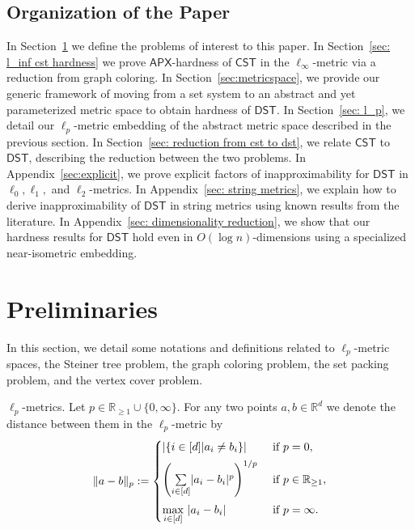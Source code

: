 \documentclass{article}\providecommand{\DeclareRedundantLanguages}[2]{}\usepackage[a4paper,margin=20mm]{geometry}
\newcommand{\R}{\mathbb{R}}
\newcommand{\1}{\textbf{1}}
\newcommand{\cst}{$\mathsf{CST}$\xspace}
\newcommand{\dst}{$\mathsf{DST}$\xspace}
\newcommand{\apx}{$\mathsf{APX}$\xspace}
\newcommand{\reals}{\mathbb{R}_{\ge 1}\cup\{0,\infty\}}
\begin{document}
\subsection{Organization of the Paper}
In Section~\ref{sec:prelim} we define the problems of interest to this paper. 
In Section~\ref{sec: l_inf cst hardness} we prove \apx-hardness of \cst in the $\ell_{\infty}$-metric via a reduction from graph coloring. In Section~\ref{sec:metricspace}, we provide our generic framework of moving from a set system to an abstract and yet parameterized metric space to obtain hardness of \dst. 
In Section~\ref{sec: l_p}, we detail our $\ell_p$-metric embedding of the abstract metric space described in the previous section. 
In Section~\ref{sec: reduction from cst to dst}, we relate \cst to \dst, describing the reduction between the two problems. In Appendix~\ref{sec:explicit}, we prove explicit factors of inapproximability for \dst in $\ell_0,\ell_1,$ and $\ell_2$-metrics. In Appendix~\ref{sec: string metrics}, we explain how to derive inapproximability of \dst in string metrics using known results from the literature. In Appendix~\ref{sec: dimensionality reduction}, we show that our hardness results for \dst hold even in $O(\log n)$-dimensions using a specialized near-isometric embedding.




\section{Preliminaries}\label{sec:prelim}

In this section, we detail some notations and definitions related to $\ell_p$-metric spaces, the Steiner tree problem, the graph coloring problem, the set packing problem, and the vertex cover problem.

\begin{paragraph}{$\ell_p$-metrics.} Let $p\in \reals$. For any two points $a,b \in \R^d$ we denote the distance between them in the $\ell_p$-metric by
\[
\| a - b \|_p := \begin{cases}
\left|\{i\in[d]| a_i\neq b_i\}\right|&\text{ if }p=0,\vspace{0.15cm}\\
\left( \underset{i\in[d]}{\sum} |a_i - b_i|^p \right)^{1/p}&\text{ if }p\in\mathbb{R}_{\ge 1},\vspace{0.15cm}\\
\underset{i \in[d]}{\max}\ |a_i-b_i|&\text{ if }p=\infty.
\end{cases}
\]
\end{paragraph}
\end{document}
